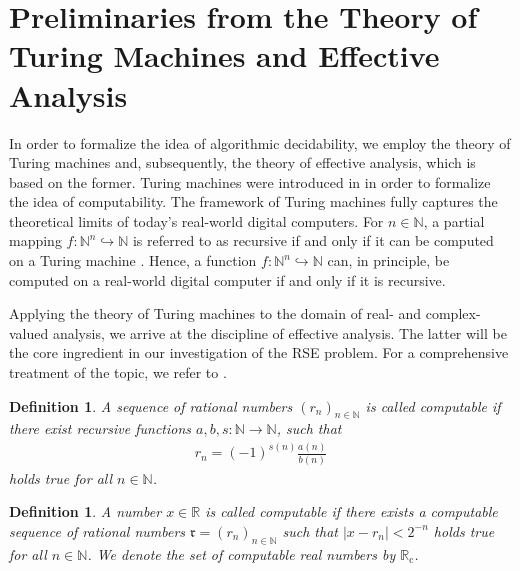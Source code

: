 \documentclass[conference]{IEEEtran}
\newcommand{\part}{\hookrightarrow}
\def\NN{{\mathbb N}}
\def\RR{{\mathbb R}}
\newcommand{\RRc}{\RR_{\mathrm{c}}}
\newtheorem{Definition}[Theorem]{Definition}
\begin{document}
\section{Preliminaries from the Theory of Turing Machines and Effective Analysis}\label{sec:introTuring}
	\noindent In order to formalize the idea of algorithmic decidability, we employ the theory of Turing machines and, subsequently, 
	the theory of effective analysis, which is based on the former.	Turing machines were introduced in \cite{T37a,T38} in order to formalize the idea of computability. 
	The framework of Turing machines fully captures the theoretical limits of today's real-world digital computers. For \(n\in\NN\), a partial mapping \(f : \NN^n \part \NN\) 
	is referred to as recursive if and only if it can be computed on a Turing machine \cite{Kl36,T37b}. Hence, a function \(f :\NN^n \part \NN\) can, in principle, be 
	computed on a real-world digital computer if and only if it is recursive. 

	Applying the theory of Turing machines to the domain of real- and complex-valued analysis, we arrive at the 
	discipline of effective analysis. The latter will be the core ingredient in our investigation of the RSE problem. 
	For a comprehensive treatment of the topic, we refer to \cite{PoRi17,AB14}.%

	\begin{Definition}  \label{ber}
						A sequence of rational numbers \((r_n)_{n\in\NN}\) is called computable if there exist recursive functions \(a,b,s:\NN\to\NN\), such that
						\begin{align*}   r_{n} = (-1)^{s(n)}\frac{a(n)}{b(n)} 
						\end{align*} 
						holds true for all \(n\in\NN\).
	\end{Definition}

	\begin{Definition}  \label{compreal}
						A number \(x\in\RR\) is called computable if there exists a computable sequence of rational numbers 
						\(\mathfrak{r} = (r_n)_{n\in\NN}\) such that \(|x-r_n|<2^{-n}\) holds true for all \(n\in\NN\). We denote the set of computable real numbers by \(\RRc\).
	\end{Definition}
\end{document}
